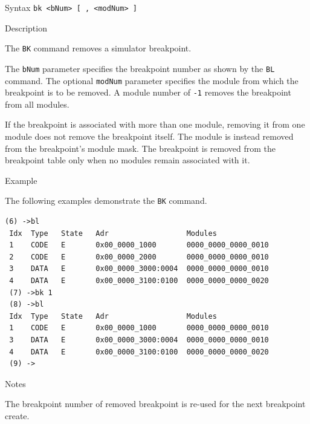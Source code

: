 %
%
\pagebreak
{}

\begin{iPageDescEntry}{Syntax}
\texttt{bk  <bNum> [ , <modNum> ] }
\end{iPageDescEntry}

\begin{iPageDescEntry}{Description}

The \texttt{BK} command removes a simulator breakpoint.

The \texttt{bNum} parameter specifies the breakpoint number as shown by
the \texttt{BL} command. The optional \texttt{modNum} parameter specifies the
module from which the breakpoint is to be removed. A module number of
\texttt{-1} removes the breakpoint from all modules.

If the breakpoint is associated with more than one module, removing it
from one module does not remove the breakpoint itself. The module is
instead removed from the breakpoint’s module mask. The breakpoint is
removed from the breakpoint table only when no modules remain
associated with it.

\end{iPageDescEntry}

\begin{iPageDescEntry}{Example}

The following examples demonstrate the \texttt{BK} command.

\begin{lstlisting}[style=iPageOpStyle]
 (6) ->bl
 Idx  Type   State   Adr                  Modules         
 1    CODE   E       0x00_0000_1000       0000_0000_0000_0010
 2    CODE   E       0x00_0000_2000       0000_0000_0000_0010
 3    DATA   E       0x00_0000_3000:0004  0000_0000_0000_0010
 4    DATA   E       0x00_0000_3100:0100  0000_0000_0000_0020
 (7) ->bk 1
 (8) ->bl
 Idx  Type   State   Adr                  Modules         
 1    CODE   E       0x00_0000_1000       0000_0000_0000_0010
 3    DATA   E       0x00_0000_3000:0004  0000_0000_0000_0010
 4    DATA   E       0x00_0000_3100:0100  0000_0000_0000_0020
 (9) ->
\end{lstlisting}

\end{iPageDescEntry}

\begin{iPageDescEntry}{Notes}

The breakpoint number of removed breakpoint is re-used for the next breakpoint create.

\end{iPageDescEntry}
